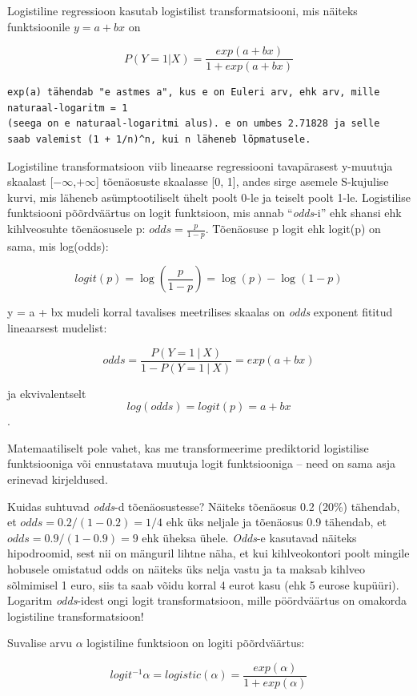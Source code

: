 \documentclass[]{book}
\begin{document}
Logistiline regressioon kasutab logistilist transformatsiooni, mis näiteks funktsioonile \(y = a + bx\) on

\[P(Y = 1 | X) =\frac{exp(a + bx)}{1 + exp(a + bx)}\]

\begin{verbatim}
exp(a) tähendab "e astmes a", kus e on Euleri arv, ehk arv, mille naturaal-logaritm = 1 
(seega on e naturaal-logaritmi alus). e on umbes 2.71828 ja selle 
saab valemist (1 + 1/n)^n, kui n läheneb lõpmatusele.
\end{verbatim}

Logistiline transformatsioon viib lineaarse regressiooni tavapärasest y-muutuja skaalast {[}\(-\infty\),\(+\infty\){]} tõenäosuste skaalasse {[}0, 1{]}, andes sirge asemele S-kujulise kurvi, mis läheneb asümptootiliselt ühelt poolt 0-le ja teiselt poolt 1-le. Logistilise funktsiooni põõrdväärtus on logit funktsioon, mis annab ``\emph{odds}-i'' ehk shansi ehk kihlveosuhte tõenäosusele p: \(odds = \frac {p}{1 - p}\). Tõenäosuse p logit ehk logit(p) on sama, mis log(odds):

\[logit(p)=\log \left({\frac {p}{1-p}}\right)=\log(p)-\log(1-p)\]

y = a + bx mudeli korral tavalises meetrilises skaalas on \emph{odds} exponent fititud lineaarsest mudelist:

\[odds= \frac {P(Y = 1 ~|~ X)}{1-P(Y = 1 ~|~ X)} = exp(a+bx)\]

ja ekvivalentselt
\[log(odds) = logit(p) = a + bx\].

Matemaatiliselt pole vahet, kas me transformeerime prediktorid logistilise funktsiooniga või ennustatava muutuja logit funktsiooniga -- need on sama asja erinevad kirjeldused.

Kuidas suhtuvad \emph{odds}-d tõenäosustesse?
Näiteks tõenäosus 0.2 (20\%) tähendab, et \(odds = 0.2/(1 - 0.2) = 1/4\) ehk üks neljale ja tõenäosus 0.9 tähendab, et \(odds = 0.9/(1 - 0.9) = 9\) ehk üheksa ühele. \emph{Odds}-e kasutavad näiteks hipodroomid, sest nii on mänguril lihtne näha, et kui kihlveokontori poolt mingile hobusele omistatud odds on näiteks üks nelja vastu ja ta maksab kihlveo sõlmimisel 1 euro, siis ta saab võidu korral 4 eurot kasu (ehk 5 eurose kupüüri). Logaritm \emph{odds}-idest ongi logit transformatsioon, mille pöördväärtus on omakorda logistiline transformatsioon!

Suvalise arvu \(\alpha\) logistiline funktsioon on logiti põõrdväärtus:

\[logit^{-1}\alpha=logistic (\alpha)={\frac {exp (\alpha) }{1+ exp (\alpha)}}\]
\end{document}
